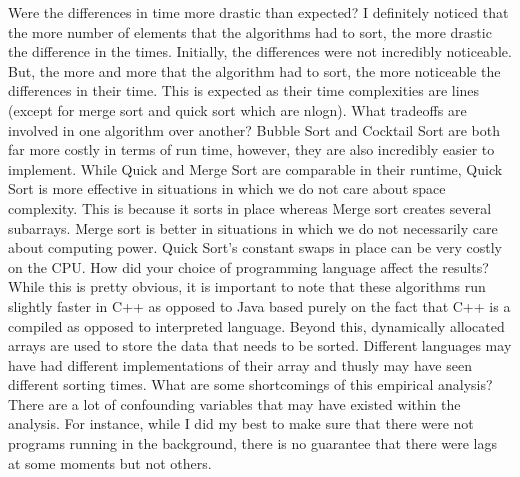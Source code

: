 \documentclass[12pt]{report}
\begin{document}
Were the differences in time more drastic than expected? 
\newline
\newline
I definitely noticed that the more number of elements that the algorithms had to sort, the more drastic the difference in the times. Initially, the differences were not incredibly noticeable. But, the more and more that the algorithm had to sort, the more noticeable the differences in their time. This is expected as their time complexities are lines (except for merge sort and quick sort which are nlogn). 
\newline
\newline
What tradeoffs are involved in one algorithm over another? 
\newline
\newline
Bubble Sort and Cocktail Sort are both far more costly in terms of run time, however, they are also incredibly easier to implement. While Quick and Merge Sort are comparable in their runtime, Quick Sort is more effective in situations in which we do not care about space complexity. This is because it sorts in place whereas Merge sort creates several subarrays. Merge sort is better in situations in which we do not necessarily care about computing power. Quick Sort’s constant swaps in place can be very costly on the CPU.
\newline
\newline
How did your choice of programming language affect the results? 
\newline
\newline
While this is pretty obvious, it is important to note that these algorithms run slightly faster in C++ as opposed to Java based purely on the fact that C++ is a compiled as opposed to interpreted language. Beyond this, dynamically allocated arrays are used to store the data that needs to be sorted. Different languages may have had different implementations of their array and thusly may have seen different sorting times.
\newline
\newline
What are some shortcomings of this empirical analysis?
\newline
\newline
There are a lot of confounding variables that may have existed within the analysis. For instance, while I did my best to make sure that there were not programs running in the background, there is no guarantee that there were lags at some moments but not others. 
\end{document}
